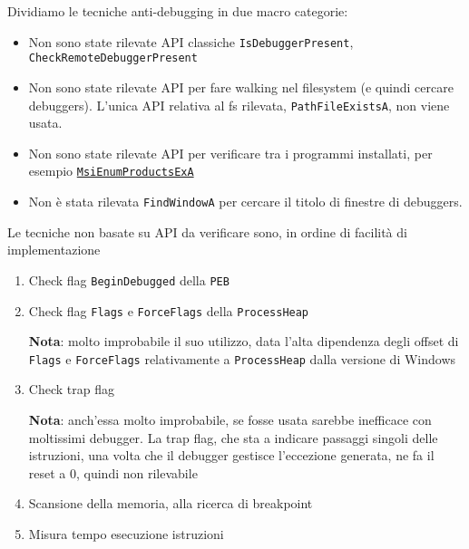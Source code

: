 \documentclass[
    a4paper, %
    11pt %
]{article}
\begin{document}
            Dividiamo le tecniche anti-debugging in due macro categorie:
            
            \begin{itemize}
                \item Non sono state rilevate API classiche \texttt{IsDebuggerPresent},
                    \texttt{CheckRemoteDebuggerPresent}
                \item Non sono state rilevate API per fare walking nel filesystem (e quindi cercare
                    debuggers). L'unica API relativa al fs rilevata, \texttt{PathFileExistsA}, non viene
                    usata.
                \item Non sono state rilevate API per verificare tra i programmi installati, per esempio
                    \href{https://learn.microsoft.com/it-it/windows/win32/api/msi/nf-msi-
                    msienumproductsexa?redirectedfrom=MSDN}{\texttt{MsiEnumProductsExA}}
                \item Non è stata rilevata \texttt{FindWindowA} per cercare il titolo di finestre di
                    debuggers.
            \end{itemize}

            Le tecniche non basate su API da verificare sono, in ordine di facilità di implementazione

            \begin{enumerate}
                \item Check flag \texttt{BeginDebugged} della \texttt{PEB}
                \item Check flag \texttt{Flags} e \texttt{ForceFlags} della \texttt{ProcessHeap}
                
                    \textbf{Nota}: molto improbabile il suo utilizzo, data l'alta dipendenza degli offset
                    di \texttt{Flags} e \texttt{ForceFlags} relativamente a \texttt{ProcessHeap} dalla
                    versione di Windows
                \item Check trap flag
                
                    \textbf{Nota}: anch'essa molto improbabile, se fosse usata sarebbe inefficace
                    con moltissimi debugger. La trap flag, che sta a indicare passaggi singoli delle
                    istruzioni, una volta che il debugger gestisce l'eccezione generata, ne fa il reset a
                    0, quindi non rilevabile
                \item Scansione della memoria, alla ricerca di breakpoint
                \item Misura tempo esecuzione istruzioni
            \end{enumerate}
\end{document}
